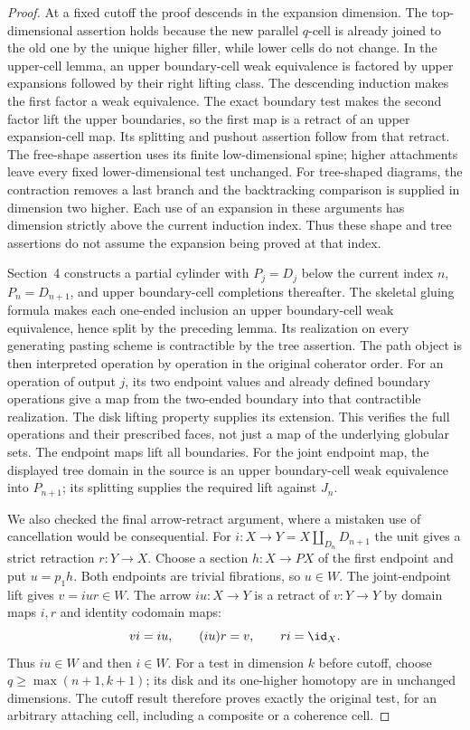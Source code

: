 \begin{proof}
At a fixed cutoff the proof descends in the expansion dimension.
The top-dimensional assertion holds because the new parallel
$q$-cell is already joined to the old one by the unique higher
filler, while lower cells do not change. In the upper-cell lemma,
an upper boundary-cell weak equivalence is factored by upper
expansions followed by their right lifting class. The descending
induction makes the first factor a weak equivalence. The exact
boundary test makes the second factor lift the upper boundaries,
so the first map is a retract of an upper expansion-cell map.
Its splitting and pushout assertion follow from that retract.
The free-shape assertion uses its finite low-dimensional spine;
higher attachments leave every fixed lower-dimensional test
unchanged. For tree-shaped diagrams, the contraction removes a
last branch and the backtracking comparison is supplied in
dimension two higher. Each use of an expansion in these arguments
has dimension strictly above the current induction index. Thus
these shape and tree assertions do not assume the expansion being
proved at that index.

Section~4 constructs a partial cylinder with $P_j=D_j$ below the
current index $n$, $P_n=D_{n+1}$, and upper boundary-cell completions
thereafter. The skeletal gluing formula makes each one-ended
inclusion an upper boundary-cell weak equivalence, hence split by
the preceding lemma. Its realization on every generating pasting
scheme is contractible by the tree assertion. The path object is
then interpreted operation by operation in the original coherator
order. For an operation of output $j$, its two endpoint values and
already defined boundary operations give a map from the
two-ended boundary into that contractible realization. The disk
lifting property supplies its extension. This verifies the full
operations and their prescribed faces, not just a map of the
underlying globular sets. The endpoint maps lift all boundaries.
For the joint endpoint map, the displayed tree domain in the
source is an upper boundary-cell weak equivalence into $P_{n+1}$;
its splitting supplies the required lift against $J_n$.

We also checked the final arrow-retract argument, where a mistaken
use of cancellation would be consequential. For
$i:X\to Y=X\amalg_{D_n}D_{n+1}$ the unit gives a strict
retraction $r:Y\to X$. Choose a section $h:X\to PX$ of the
first endpoint and put $u=p_1h$. Both endpoints are trivial
fibrations, so $u\in W$. The joint-endpoint lift gives
$v=iur\in W$. The arrow $iu:X\to Y$ is a retract of
$v:Y\to Y$ by domain maps $i,r$ and identity codomain maps:
\[
 vi=iu,\qquad (iu)r=v,\qquad ri=\id_X.
\]
Thus $iu\in W$ and then $i\in W$. For a test in dimension $k$
before cutoff, choose $q\geq\max(n+1,k+1)$; its disk and its
one-higher homotopy are in unchanged dimensions. The cutoff result
therefore proves exactly the original test, for an arbitrary
attaching cell, including a composite or a coherence cell.


\end{proof}
